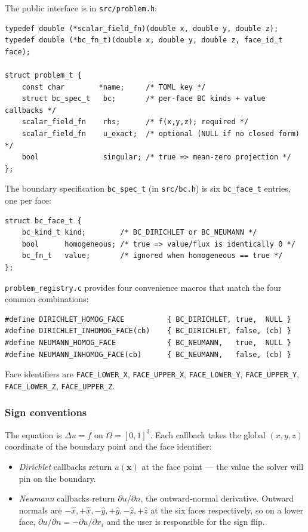 \documentclass[11pt]{article}
\theoremstyle{definition}
\begin{document}
The public interface is in \texttt{src/problem.h}:
\begin{lstlisting}
typedef double (*scalar_field_fn)(double x, double y, double z);
typedef double (*bc_fn_t)(double x, double y, double z, face_id_t face);

struct problem_t {
    const char        *name;     /* TOML key */
    struct bc_spec_t   bc;       /* per-face BC kinds + value callbacks */
    scalar_field_fn    rhs;      /* f(x,y,z); required */
    scalar_field_fn    u_exact;  /* optional (NULL if no closed form) */
    bool               singular; /* true => mean-zero projection */
};
\end{lstlisting}
The boundary specification \texttt{bc\_spec\_t} (in
\texttt{src/bc.h}) is six \texttt{bc\_face\_t} entries, one per face:
\begin{lstlisting}
struct bc_face_t {
    bc_kind_t kind;        /* BC_DIRICHLET or BC_NEUMANN */
    bool      homogeneous; /* true => value/flux is identically 0 */
    bc_fn_t   value;       /* ignored when homogeneous == true */
};
\end{lstlisting}
\texttt{problem\_registry.c} provides four convenience macros that
match the four common combinations:
\begin{lstlisting}
#define DIRICHLET_HOMOG_FACE          { BC_DIRICHLET, true,  NULL }
#define DIRICHLET_INHOMOG_FACE(cb)    { BC_DIRICHLET, false, (cb) }
#define NEUMANN_HOMOG_FACE            { BC_NEUMANN,   true,  NULL }
#define NEUMANN_INHOMOG_FACE(cb)      { BC_NEUMANN,   false, (cb) }
\end{lstlisting}
Face identifiers are \verb|FACE_LOWER_X|, \verb|FACE_UPPER_X|,
\verb|FACE_LOWER_Y|, \verb|FACE_UPPER_Y|, \verb|FACE_LOWER_Z|,
\verb|FACE_UPPER_Z|.

\subsubsection{Sign conventions}

The equation is $\Delta u = f$ on $\Omega = [0,1]^3$.  Each callback
takes the global $(x,y,z)$ coordinate of the boundary point and the
face identifier:
\begin{itemize}[leftmargin=*,nosep]
\item \emph{Dirichlet} callbacks return $u(\mathbf{x})$ at the face
  point --- the value the solver will pin on the boundary.
\item \emph{Neumann} callbacks return $\partial u/\partial n$, the
  outward-normal derivative.  Outward normals are
  $-\hat{x}, +\hat{x}, -\hat{y}, +\hat{y}, -\hat{z}, +\hat{z}$ at the
  six faces respectively, so on a lower face,
  $\partial u/\partial n = -\partial u/\partial x_i$ and the user is
  responsible for the sign flip.
\end{itemize}
\end{document}

